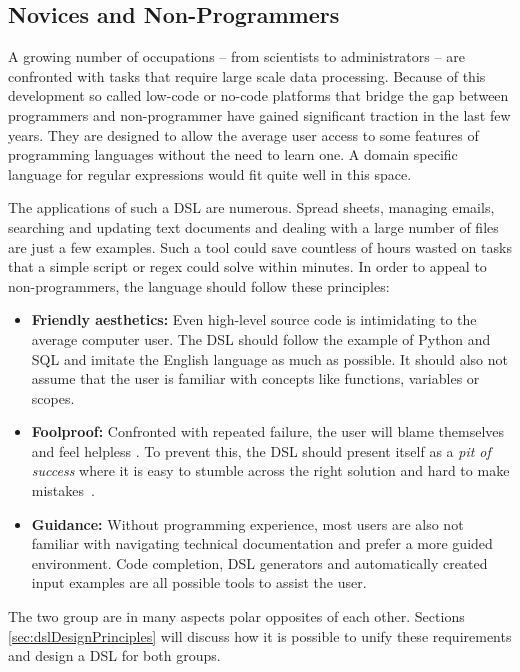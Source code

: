 \subsection{Novices and Non-Programmers} \label{sec:demoNovice}

A growing number of occupations -- from scientists to administrators -- are confronted with tasks that require large scale data processing. Because of this development so called low-code or no-code platforms that bridge the gap between programmers and non-programmer have gained significant traction in the last few years. They are designed to allow the average user access to some features of programming languages without the need to learn one. A domain specific language for regular expressions would fit quite well in this space.

The applications of such a DSL are numerous. Spread sheets, managing emails, searching and updating text documents and dealing with a large number of files are just a few examples. Such a tool could save countless of hours wasted on tasks that a simple script or regex could solve within minutes. In order to appeal to non-programmers, the language should follow these principles:

\begin{itemize}
    \item \textbf{Friendly aesthetics:}
    Even high-level source code is intimidating to the average computer user. The DSL should follow the example of Python and SQL and imitate the English language as much as possible. It should also not assume that the user is familiar with concepts like functions, variables or scopes.
    \item \textbf{Foolproof:} 
    Confronted with repeated failure, the user will blame themselves and feel helpless \cite{DesignOfEverydayThings}. To prevent this, the DSL should present itself as a \emph{pit of success} where it is easy to stumble across the right solution and hard to make mistakes~\cite{PitOfSuccess}.
    \item \textbf{Guidance:}
    Without programming experience, most users are also not familiar with navigating technical documentation and prefer a more guided environment. Code completion, DSL generators and automatically created input examples are all possible tools to assist the user.
\end{itemize}

The two group are in many aspects polar opposites of each other. Sections \ref{sec:dslDesignPrinciples} will discuss how it is possible to unify these requirements and design a DSL for both groups.

